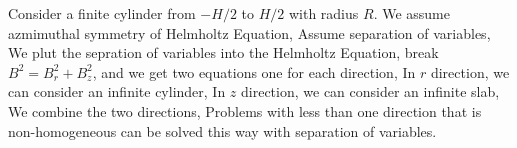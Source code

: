 \documentclass{school-22.211-notes}
\begin{document}
\clearpage
{} 
Consider a finite cylinder from $-H/2$ to $H/2$ with radius $R$. We assume azmimuthal symmetry of Helmholtz Equation, 
Assume separation of variables,
We plut the sepration of variables into the Helmholtz Equation, break $B^2 = B_r^2 + B_z^2$, and we get two equations one for each direction, 
In $r$ direction, we can consider an infinite cylinder, 
In $z$ direction, we can consider an infinite slab,
We combine the two directions,
Problems with less than one direction that is non-homogeneous can be solved this way with separation of variables.
\end{document}
